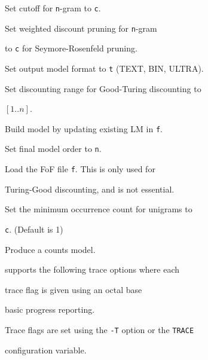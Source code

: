 \begin{optlist}


   Set cutoff for \texttt{n}-gram to \texttt{c}.





   Set weighted discount pruning for \texttt{n}-gram


                   to \texttt{c} for Seymore-Rosenfeld pruning.





   Set output model format to \texttt{t} (TEXT, BIN, ULTRA).





   Set discounting range for Good-Turing discounting to


                $[1..n]$.





   Build model by updating existing LM in \texttt{f}.





   Set final model order to \texttt{n}.





   Load the FoF file \texttt{f}. This is only used for


	         Turing-Good discounting, and is not essential.





   Set the minimum occurrence count for unigrams to


	        \texttt{c}.  (Default is 1)





   Produce a counts model.


\end{optlist}















 supports the following trace options where each


trace flag is given using an octal base


\begin{optlist}





  basic progress reporting. 


\end{optlist}


Trace flags are set using the \texttt{-T} option or the  \texttt{TRACE} 


configuration variable.



















